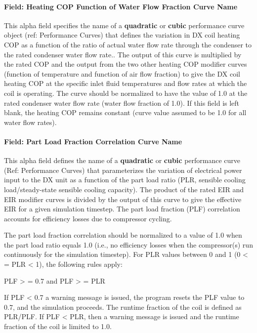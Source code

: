 \paragraph{Field: Heating COP Function of Water Flow Fraction Curve Name}\label{field-heating-cop-function-of-water-flow-fraction-curve-name}

This alpha field specifies the name of a \textbf{quadratic} or \textbf{cubic} performance curve object (ref: Performance Curves) that defines the variation in DX coil heating COP as a function of the ratio of actual water flow rate through the condenser to the rated condenser water flow rate.. The output of this curve is multiplied by the rated COP and the output from the two other heating COP modifier curves (function of temperature and function of air flow fraction) to give the DX coil heating COP at the specific inlet fluid temperatures and flow rates at which the coil is operating. The curve should be normalized to have the value of 1.0 at the rated condenser water flow rate (water flow fraction of 1.0). If this field is left blank, the heating COP remains constant (curve value assumed to be 1.0 for all water flow rates).

\paragraph{Field: Part Load Fraction Correlation Curve Name}\label{field-part-load-fraction-correlation-curve-name-8}

This alpha field defines the name of a \textbf{quadratic} or \textbf{cubic} performance curve (Ref: Performance Curves) that parameterizes the variation of electrical power input to the DX unit as a function of the part load ratio (PLR, sensible cooling load/steady-state sensible cooling capacity). The product of the rated EIR and EIR modifier curves is divided by the output of this curve to give the effective EIR for a given simulation timestep. The part load fraction (PLF) correlation accounts for efficiency losses due to compressor cycling.

The part load fraction correlation should be normalized to a value of 1.0 when the part load ratio equals 1.0 (i.e., no efficiency losses when the compressor(s) run continuously for the simulation timestep). For PLR values between 0 and 1 (0 \textless{} = PLR \textless{} 1), the following rules apply:

PLF \textgreater{} = 0.7 and PLF \textgreater{} = PLR

If PLF \textless{} 0.7 a warning message is issued, the program resets the PLF value to 0.7, and the simulation proceeds. The runtime fraction of the coil is defined as PLR/PLF. If PLF \textless{} PLR, then a warning message is issued and the runtime fraction of the coil is limited to 1.0.


